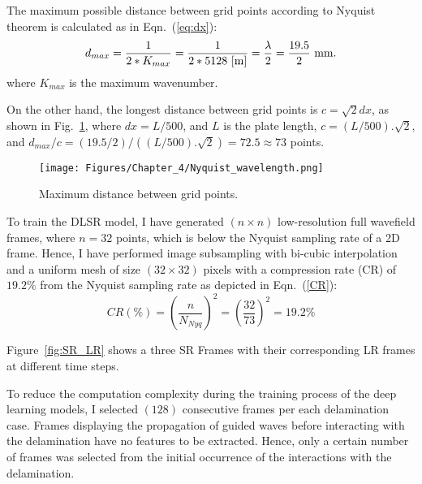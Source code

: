 The maximum possible distance between grid points according to Nyquist theorem is calculated as in Eqn.~(\ref{eq:dx}):
\begin{equation}
	d_{max}= \frac{1}{2*K_{max}} = \frac{1}{2*5128\ [\textup{m}]} = \frac{\lambda}{2} = \frac{19.5}{2}\ \textup{mm}.
	\label{eq:dx}	
\end{equation} 
where $K_{max}$ is the maximum wavenumber.

On the other hand, the longest distance between grid points is $c=\sqrt{2}dx$, as shown in Fig.~\ref{fig:Nyquist}, where $dx=L/500$, and $L$ is the plate length, $c=(L/500).\sqrt{2}$, and $d_{max}/c = (19.5/2)/((L/500).\sqrt{2}) = 72.5 \approx73 $ points.

\begin{figure} [!h]
	\centering
	\texttt{[image: Figures/Chapter\_4/Nyquist\_wavelength.png]}
	\caption{Maximum distance between grid points.}
	\label{fig:Nyquist}
\end{figure}


To train the DLSR model, I have generated \((n\times n)\) low-resolution full wavefield frames, where $n=32$ points, which is below the Nyquist sampling rate of a 2D frame.
Hence, I have performed image subsampling with bi-cubic interpolation and a uniform mesh of size \((32\times32)\) pixels with a compression rate (CR) of \(19.2\%\) from the Nyquist sampling rate as depicted in Eqn.~(\ref{CR}):
\begin{equation}
	CR(\%) = (\frac{n}{N_{Nyq}})^2 = (\frac{32}{73})^2=19.2\%
	\label{CR}
\end{equation}

Figure~\ref{fig:SR_LR} shows a three SR Frames with their corresponding LR frames at different time steps.

To reduce the computation complexity during the training process of the deep learning models, I selected \((128)\) consecutive frames per each delamination case.
Frames display\-ing the propagation of guided waves before interacting with the delamination have no features to be extracted. 
Hence, only a certain number of frames was selected from the initial occurrence of the interactions with the delamination.

